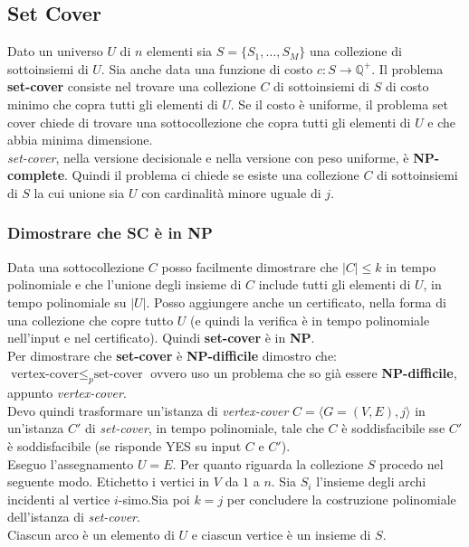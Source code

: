 \subsection{Set Cover}
Dato un universo $U$ di $n$ elementi sia $S=\{S_1,\ldots,S_M\}$ una collezione di sottoinsiemi di $U$. Sia anche data una funzione di costo $c:S\to\mathbb{Q}^+$. Il problema \textbf{set-cover} consiste nel trovare una collezione $C$ di sottoinsiemi di $S$ di costo minimo che copra tutti gli elementi di $U$. Se il costo è uniforme, il problema set cover chiede di trovare una sottocollezione che copra tutti gli elementi di $U$ e che abbia minima dimensione.\\

\textit{set-cover}, nella versione decisionale e nella versione con peso uniforme, è \textbf{NP-complete}. Quindi il problema ci chiede se esiste una collezione $C$ di sottoinsiemi di $S$ la cui unione sia $U$ con cardinalità minore uguale di $j$.
\subsubsection{Dimostrare che SC è in NP}
Data una sottocollezione $C$ posso facilmente dimostrare che $|C|\leq k$ in tempo polinomiale e che l'unione degli insieme di $C$ include tutti gli elementi di $U$, in tempo polinomiale su $|U|$. 
Posso aggiungere anche un certificato, nella forma di una collezione che copre tutto $U$ (e quindi la verifica è in tempo polinomiale nell'input e nel certificato). Quindi \textbf{set-cover} è in \textbf{NP}.\\ 

Per dimostrare che \textbf{set-cover} è \textbf{NP-difficile} dimostro che: $\mbox{vertex-cover} \leq_p \mbox{set-cover}$ ovvero uso un problema che so già essere \textbf{NP-difficile}, appunto \textit{vertex-cover}.\\ 

Devo quindi trasformare un'istanza di \textit{vertex-cover} $C=\langle G=(V,E), j\rangle$ in un'istanza $C'$ di \textit{set-cover}, in tempo polinomiale, tale che $C$ è soddisfacibile sse $C'$ è soddisfacibile (se risponde YES su input $C$ e $C'$).\\ 
Eseguo l'assegnamento  $U = E$. Per quanto riguarda la collezione $S$ procedo nel seguente modo. Etichetto i vertici in $V$ da $1$ a $n$. Sia $S_i$ l'insieme degli archi incidenti al vertice $i$-simo.Sia poi $k=j$ per concludere la costruzione polinomiale dell'istanza di \textit{set-cover}.\\ Ciascun arco è un elemento di $U$ e ciascun vertice è un insieme di $S$.\\

